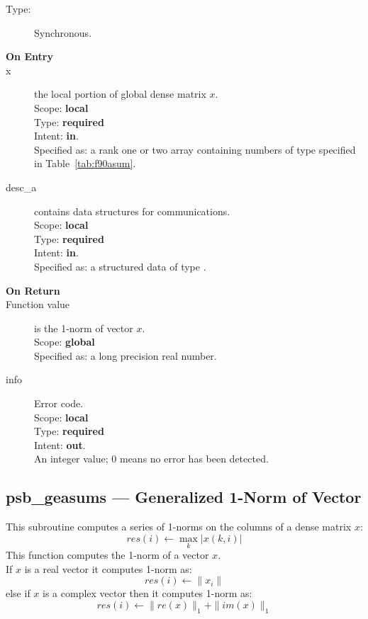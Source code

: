 \begin{description}
\item[Type:] Synchronous.
\item[\bf On Entry]
\item[x] the local portion of global dense matrix
$x$. %
\\
Scope: {\bf local} \\
Type: {\bf required} \\
Intent: {\bf in}.\\
Specified as: a rank one or two array 
containing numbers of type specified in
Table~\ref{tab:f90asum}.
\item[desc\_a] contains data structures for communications.\\
Scope: {\bf local} \\
Type: {\bf required}\\
Intent: {\bf in}.\\
Specified as: a structured data of type \descdata.

\item[\bf On Return] 
\item[Function value] is the 1-norm of vector $x$.\\
Scope: {\bf global} \\
Specified as: a long precision real  number.
\item[info] Error code.\\
Scope: {\bf local} \\
Type: {\bf required} \\
Intent: {\bf out}.\\
An integer value; 0 means no error has been detected. 
\end{description}


\clearpage\subsection*{psb\_geasums --- Generalized 1-Norm of Vector}    

This subroutine computes a series of  1-norms on the columns of
a  dense matrix  $x$: 
\[ res(i) \leftarrow \max_k |x(k,i)| \]
This function computes the 1-norm of a vector $x$.\\
If $x$ is a real vector 
it computes 1-norm as:
\[ res(i) \leftarrow  \|x_i\|\]
else if $x$ is a complex vector then it computes 1-norm  as:
\[ res(i) \leftarrow \|re(x)\|_1 + \|im(x)\|_1\]


